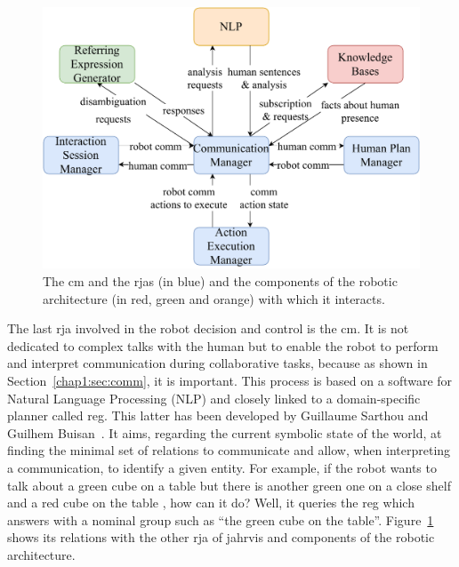 \documentclass[a4paper,11pt,twoside]{StyleThese}
\begin{document}
\begin{figure}[!hbt]
	\centering
	\includegraphics[width=0.85\linewidth]{figures/chapter2/comm_manager_zoom.pdf}
	\caption{The \acrlong{cm} and the \acrshort{rja}s (in blue) and the components of the robotic architecture (in red, green and orange) with which it interacts.}
	\label{chap6:fig:comm_manager_zoom}
\end{figure}

The last \acrshort{rja} involved in the robot decision and control is the \acrfull{cm}. It is not dedicated to complex talks with the human but to enable the robot to perform and interpret communication during collaborative tasks, because as shown in Section~\ref{chap1:sec:comm}, it is important. This process is based on a software for Natural Language Processing (NLP) and closely linked to a domain-specific planner called \acrfull{reg}. This latter has been developed by Guillaume Sarthou and Guilhem Buisan~\cite{buisan_2020_efficient}. It aims, regarding the current symbolic state of the world, at finding the minimal set of relations to communicate and allow, when interpreting a communication, to identify a given entity. For example, if the robot wants to talk about a green cube on a table but there is another green one on a close shelf and a red cube on the table , how can it do? Well, it queries the \acrshort{reg} which answers with a nominal group such as ``the green cube on the table''. Figure~\ref{chap6:fig:comm_manager_zoom} shows its relations with the other \acrshort{rja} of \acrshort{jahrvis} and components of the robotic architecture.
\end{document}
